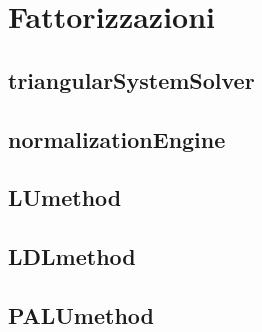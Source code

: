 \section{Fattorizzazioni}
\subsection{triangularSystemSolver}


\subsection{normalizationEngine}


\subsection{LUmethod}
\label{subsection:LUmethod}


\subsection{LDLmethod}
\label{subsection:LDLmethod}


\subsection{PALUmethod}
\label{subsection:PALUmethod}
